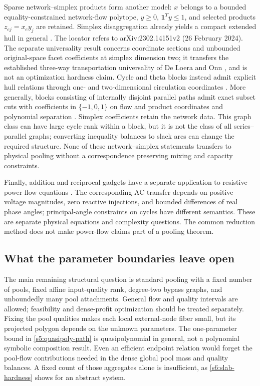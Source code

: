 Sparse network--simplex products form another model:
$x$ belongs to a bounded equality-constrained network-flow polytope,
$y\ge0$, $\mathbf1^Ty\le1$, and selected products $z_{ej}=x_ey_j$
are retained. Simplex disaggregation already yields a compact extended
hull in general \cite[Appendix, equation~(25)]{s6:khademnia2024v2}.
The locator refers to arXiv:2302.14151v2 (26 February 2024).
The separate universality result
\cite{s6:network-universality-note} concerns coordinate sections and
unbounded original-space facet coefficients at simplex dimension two;
it transfers the established three-way transportation universality of
De Loera and Onn \cite{s6:deloera2006}, and is not an optimization
hardness claim. Cycle and theta blocks instead admit explicit hull
relations through one- and two-dimensional circulation coordinates
\cite{s6:network-cycle-note}. More generally, blocks consisting of
internally disjoint parallel paths admit exact subset cuts with
coefficients in $\{-1,0,1\}$ on flow and product coordinates and
polynomial separation \cite{s6:network-parallel-note}. Simplex
coefficients retain the network data. This graph class can have large
cycle rank within a block, but it is not the class of all series--parallel
graphs; converting inequality balances to slack arcs can change the
required structure. None of these network--simplex statements transfers
to physical pooling without a correspondence preserving mixing and
capacity constraints.

Finally, addition and reciprocal gadgets have a separate application
to resistive power-flow equations \cite{s6:power-note}. The corresponding
AC transfer depends on positive voltage magnitudes, zero reactive
injections, and bounded differences of real phase angles; principal-angle
constraints on cycles have different semantics. These are separate
physical equations and complexity questions. The common reduction
method does not make power-flow claims part of a pooling theorem.

\subsection{What the parameter boundaries leave open}\label{s6:open}
The main remaining structural question is standard pooling with a fixed
number of pools, fixed affine input-quality rank, degree-two bypass
graphs, and unboundedly many pool attachments. General flow and quality
intervals are allowed; feasibility and dense-profit optimization should
be treated separately. Fixing the pool qualities makes each local
external-node fiber small, but its projected polygon depends on the
unknown parameters. The one-parameter bound in \cref{s5:quasipoly-path}
is quasipolynomial in general, not a polynomial symbolic composition
result. Even an efficient endpoint relation would forget the pool-flow
contributions needed in the dense global pool mass and quality balances.
A fixed count of those aggregates alone is insufficient, as
\cref{s6:slab-hardness} shows for an abstract system.

